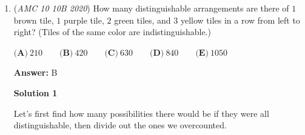 \begin{enumerate}
 $\textbf{(A)}\ 2 \qquad\textbf{(B)}\ 3 \qquad\textbf{(C)}\  5 \qquad\textbf{(D)}\ 7 \qquad\textbf{(E)}\ 11$

 \textbf{Answer: }D



\textbf{Solution 1}

Since the three angles of a triangle add up to $180^{\circ}$ and one of the angles is $90^{\circ}$ because it's a right triangle, $a^{\circ} + b^{\circ} = 90^{\circ}$.

 The greatest prime number less than $90$ is $89$. If $a=89^{\circ}$, then $b=90^{\circ}-89^{\circ}=1^{\circ}$, which is not prime.

 The next greatest prime number less than $90$ is $83$. If $a=83^{\circ}$, then $b=7^{\circ}$, which IS prime, so we have our answer $\boxed{\textbf{(D)}\ 7}$ ~quacker88

 



\textbf{Solution 2}

Looking at the answer choices, only $7$ and $11$ are coprime to $90$. Testing $7$, the smaller angle, makes the other angle $83$ which is prime, therefore our answer is $\boxed{\textbf{(D)}\ 7}$




\textbf{Solution 3 (Euclidean Algorithm)}

It is clear that $\gcd(a,b)=1.$ By the Euclidean Algorithm, we have 
 \[\gcd(a,b)=\gcd(a+b,b)=\gcd(90,b)=1,\] so $90$ and $b$ are relatively prime.

 The least such prime number $b$ is $7,$ from which $a=90-b=83$ is also a prime number. Therefore, the answer is $\boxed{\textbf{(D)}\ 7}.$



	\item (\textit{AMC 10 10B 2020}) How many distinguishable arrangements are there of $1$ brown tile, $1$ purple tile, $2$ green tiles, and $3$ yellow tiles in a row from left to right? (Tiles of the same color are indistinguishable.)


 $\textbf{(A)}\ 210 \qquad\textbf{(B)}\ 420 \qquad\textbf{(C)}\  630 \qquad\textbf{(D)}\ 840 \qquad\textbf{(E)}\ 1050$

 \textbf{Answer: }B



\textbf{Solution 1}

Let's first find how many possibilities there would be if they were all distinguishable, then divide out the ones we overcounted.


\end{enumerate}
